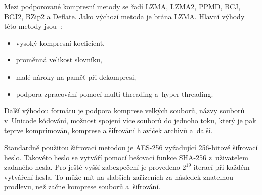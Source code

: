  Mezi podporované kompresní metody se řadí LZMA, LZMA2, PPMD, BCJ, BCJ2, BZip2 a
Deflate. Jako výchozí metoda je brána LZMA. Hlavní výhody této metody jsou~\cite{7z:2015}:
\begin{itemize}
    \item vysoký kompresní koeficient,
    \item proměnná velikost slovníku,
    \item malé nároky na paměť při dekompresi,
    \item podpora zpracování pomocí multi-threading a~hyper-threading.
\end{itemize}
Další výhodou formátu je podpora komprese velkých souborů, názvy souborů v~Unicode
kódování, možnost spojení více souborů do jednoho toku, který je pak teprve komprimován, komprese
a šifrování hlaviček archivů a~další.

 Standardně použitou šifrovací metodou je AES-256 vyžadující 256-bitové šifrovací heslo.
Takovéto heslo se vytváří pomocí hešovací funkce SHA-256 z~uživatelem zadaného hesla. Pro ještě
vyšší zabezpečení je provedeno \(2^{19}\) iterací při každém vytváření hesla. To může mít na
slabších zařízeních za následek znatelnou prodlevu, než začne komprese souborů a~šifrování.

